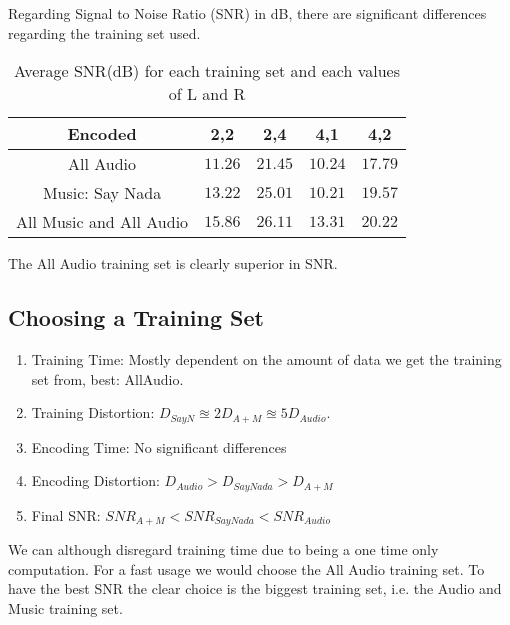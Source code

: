 \documentclass[a4paper, 11pt]{article}
\begin{document}
		Regarding Signal to Noise Ratio (SNR) in dB, there are significant differences regarding the training set used.
		
		\begin{table}[H]
			\centering
			\begin{tabular}{c|c|c|c|c}
				\textbf{Encoded} 			& \textbf{2,2} 	& \textbf{2,4}	& \textbf{4,1}	& \textbf{4,2} \\ \hline
				All Audio 					& $ 11.26 $ 	& $ 21.45 $		& $ 10.24 $ 	& $ 17.79 $	\\ \hline
				Music: Say Nada				& $ 13.22 $		& $ 25.01 $		& $ 10.21 $ 	& $ 19.57 $	\\ \hline
				All Music and All Audio 	& $ 15.86 $		& $	26.11 $		& $ 13.31 $		& $	20.22 $	\\
			\end{tabular}
			\caption{Average SNR(dB) for each training set and each values of L and R}
			\label{table:EncodeSNRT}
		\end{table}
		
		The All Audio training set is clearly superior in SNR.
		
		\subsection{Choosing a Training Set}
			\begin{enumerate}
				\item Training Time: Mostly dependent on the amount of data we get the training set from, best: AllAudio.
				\item Training Distortion: $ D_{SayN} \approxeq 2 D_{A+M} \approxeq 5 D_{Audio} $.
				\item Encoding Time: No significant differences
				\item Encoding Distortion: $  D_{Audio} > D_{SayNada} > D_{A+M} $
				\item Final SNR: $  SNR_{A+M} < SNR_{SayNada} < SNR_{Audio} $
			\end{enumerate}
			
			We can although disregard training time due to being a one time only computation.
			For a fast usage we would choose the All Audio training set.
			To have the best SNR the clear choice is the biggest training set, i.e. the Audio and Music training set.
			
	
\end{document}
